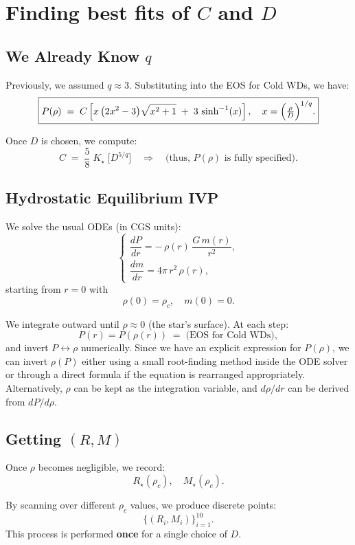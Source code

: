 \documentclass[12pt]{article}
\begin{document}
\clearpage

\section{Finding best fits of \(C\) and \(D\)}

\subsection{We Already Know \(q\)}

Previously, we assumed \(q \approx 3\). Substituting into the EOS for Cold WDs, we have:
\[
\boxed{
P(\rho)
\;=\;
C
\left[
  x\,\bigl(2x^2 - 3\bigr)\sqrt{x^2 + 1}
  \;+\; 3\,\sinh^{-1}(x)
\right],
\quad
x = \Bigl(\tfrac{\rho}{D}\Bigr)^{1/q}.
}
\]

Once \(D\) is chosen, we compute:
\[
C \;=\;\frac{5}{8}\;K_\star\;\bigl[D^{5/q}\bigr]
\quad\Longrightarrow\quad
\text{(thus, \(P(\rho)\) is fully specified).}
\]

\subsection{Hydrostatic Equilibrium IVP}

We solve the usual ODEs (in CGS units):
\[
\begin{cases}
\dfrac{dP}{dr} = -\,\rho(r)\,\dfrac{G\,m(r)}{r^2},\\[6pt]
\dfrac{dm}{dr} = 4\pi\,r^2\,\rho(r),
\end{cases}
\]
starting from \(r=0\) with
\[
\rho(0) = \rho_c,\quad
m(0) = 0.
\]

We integrate outward until \(\rho \approx 0\) (the star’s surface). At each step:
\[
P(r) = P(\rho(r)) \;=\; \text{(EOS for Cold WDs)},
\]
and invert \(P \leftrightarrow \rho\) numerically. Since we have an explicit expression for \(P(\rho)\), we can invert \(\rho(P)\) either using a small root-finding method inside the ODE solver or through a direct formula if the equation is rearranged appropriately. Alternatively, \(\rho\) can be kept as the integration variable, and \(d\rho/dr\) can be derived from \(dP/d\rho\).

\subsection{Getting \((R, M)\)}

Once \(\rho\) becomes negligible, we record:
\[
R_{\star}(\rho_c),\quad M_{\star}(\rho_c).
\]

By scanning over different \(\rho_c\) values, we produce discrete points:
\[
\bigl\{(R_i, M_i)\bigr\}_{i=1}^{10}.
\]
This process is performed \textbf{once} for a single choice of \(D\).
\end{document}
